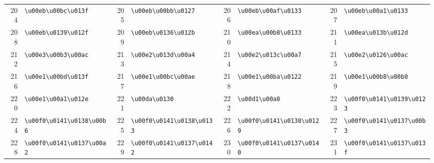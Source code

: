\begin{table}[!htbp]
\begin{tabular}{r l r l r l r l}
204 & \texttt{\textbackslash{}u00eb\textbackslash{}u00bc\textbackslash{}u013f} & 205 & \texttt{\textbackslash{}u00eb\textbackslash{}u00bb\textbackslash{}u0127} & 206 & \texttt{\textbackslash{}u00eb\textbackslash{}u00af\textbackslash{}u0133} & 207 & \texttt{\textbackslash{}u00eb\textbackslash{}u00a1\textbackslash{}u0133} \\
208 & \texttt{\textbackslash{}u00eb\textbackslash{}u0139\textbackslash{}u012f} & 209 & \texttt{\textbackslash{}u00eb\textbackslash{}u0136\textbackslash{}u012b} & 210 & \texttt{\textbackslash{}u00ea\textbackslash{}u00b8\textbackslash{}u0133} & 211 & \texttt{\textbackslash{}u00ea\textbackslash{}u013b\textbackslash{}u012d} \\
212 & \texttt{\textbackslash{}u00e3\textbackslash{}u00b3\textbackslash{}u00ac} & 213 & \texttt{\textbackslash{}u00e2\textbackslash{}u013d\textbackslash{}u00a4} & 214 & \texttt{\textbackslash{}u00e2\textbackslash{}u013c\textbackslash{}u00a7} & 215 & \texttt{\textbackslash{}u00e2\textbackslash{}u0126\textbackslash{}u00ac} \\
216 & \texttt{\textbackslash{}u00e1\textbackslash{}u00bd\textbackslash{}u013f} & 217 & \texttt{\textbackslash{}u00e1\textbackslash{}u00bc\textbackslash{}u00ae} & 218 & \texttt{\textbackslash{}u00e1\textbackslash{}u00ba\textbackslash{}u0122} & 219 & \texttt{\textbackslash{}u00e1\textbackslash{}u00b8\textbackslash{}u00b0} \\
220 & \texttt{\textbackslash{}u00e1\textbackslash{}u00a1\textbackslash{}u012e} & 221 & \texttt{\textbackslash{}u00da\textbackslash{}u0130} & 222 & \texttt{\textbackslash{}u00d1\textbackslash{}u00a8} & 223 & \texttt{\textbackslash{}u00f0\textbackslash{}u0141\textbackslash{}u0139\textbackslash{}u0123} \\
224 & \texttt{\textbackslash{}u00f0\textbackslash{}u0141\textbackslash{}u0138\textbackslash{}u00b6} & 225 & \texttt{\textbackslash{}u00f0\textbackslash{}u0141\textbackslash{}u0138\textbackslash{}u0133} & 226 & \texttt{\textbackslash{}u00f0\textbackslash{}u0141\textbackslash{}u0138\textbackslash{}u0129} & 227 & \texttt{\textbackslash{}u00f0\textbackslash{}u0141\textbackslash{}u0137\textbackslash{}u00b3} \\
228 & \texttt{\textbackslash{}u00f0\textbackslash{}u0141\textbackslash{}u0137\textbackslash{}u00a2} & 229 & \texttt{\textbackslash{}u00f0\textbackslash{}u0141\textbackslash{}u0137\textbackslash{}u0142} & 230 & \texttt{\textbackslash{}u00f0\textbackslash{}u0141\textbackslash{}u0137\textbackslash{}u0140} & 231 & \texttt{\textbackslash{}u00f0\textbackslash{}u0141\textbackslash{}u0137\textbackslash{}u013f} \\

\end{tabular}
\end{table}
